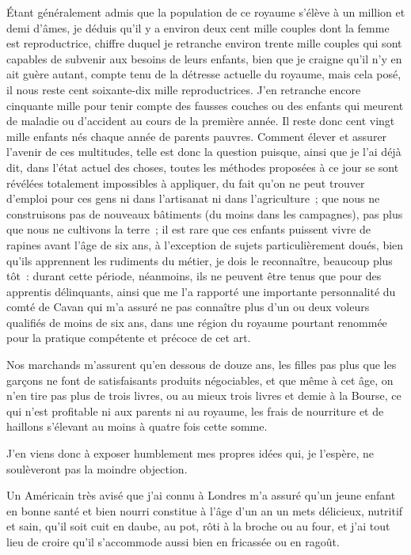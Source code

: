 \documentclass[french,twoside]{book} %
\begin{document}
Étant généralement admis que la population de ce royaume s’élève à un million et demi d’âmes, je déduis qu’il y a environ deux cent mille couples dont la femme est reproductrice, chiffre duquel je retranche environ trente mille couples qui sont capables de subvenir aux besoins de leurs enfants, bien que je craigne qu’il n’y en ait guère autant, compte tenu de la détresse actuelle du royaume, mais cela posé, il nous reste cent soixante-dix mille reproductrices. J’en retranche encore cinquante mille pour tenir compte des fausses couches ou des enfants qui meurent de maladie ou d’accident au cours de la première année. Il reste donc cent vingt mille enfants nés chaque année de parents pauvres. Comment élever et assurer l’avenir de ces multitudes, telle est donc la question puisque, ainsi que je l’ai déjà dit, dans l’état actuel des choses, toutes les méthodes proposées à ce jour se sont révélées totalement impossibles à appliquer, du fait qu’on ne peut trouver d’emploi pour ces gens ni dans l’artisanat ni dans l’agriculture ; que nous ne construisons pas de nouveaux bâtiments (du moins dans les campagnes), pas plus que nous ne cultivons la terre ; il est rare que ces enfants puissent vivre de rapines avant l’âge de six ans, à l’exception de sujets particulièrement doués, bien qu’ils apprennent les rudiments du métier, je dois le reconnaître, beaucoup plus tôt : durant cette période, néanmoins, ils ne peuvent être tenus que pour des apprentis délinquants, ainsi que me l’a rapporté une importante personnalité du comté de Cavan qui m’a assuré ne pas connaître plus d’un ou deux voleurs qualifiés de moins de six ans, dans une région du royaume pourtant renommée pour la pratique compétente et précoce de cet art.\par
Nos marchands m’assurent qu’en dessous de douze ans, les filles pas plus que les garçons ne font de satisfaisants produits négociables, et que même à cet âge, on n’en tire pas plus de trois livres, ou au mieux trois livres et demie à la Bourse, ce qui n’est profitable ni aux parents ni au royaume, les frais de nourriture et de haillons s’élevant au moins à quatre fois cette somme.\par
J’en viens donc à exposer humblement mes propres idées qui, je l’espère, ne soulèveront pas la moindre objection.\par
Un Américain très avisé que j’ai connu à Londres m’a assuré qu’un jeune enfant en bonne santé et bien nourri constitue à l’âge d’un an un mets délicieux, nutritif et sain, qu’il soit cuit en daube, au pot, rôti à la broche ou au four, et j’ai tout lieu de croire qu’il s’accommode aussi bien en fricassée ou en ragoût.\par
\end{document}
